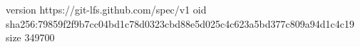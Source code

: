 version https://git-lfs.github.com/spec/v1
oid sha256:79859f2f9b7cc04bd1c78d0323cbd88e5d025c4c623a5bd377c809a94d1c4c19
size 349700
